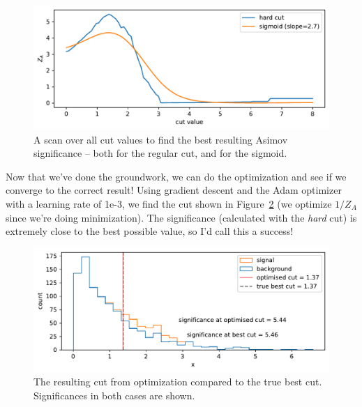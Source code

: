 \documentclass[
  11pt,
  numbers=noendperiod]{book}
\begin{document}
\begin{figure}

{\centering \includegraphics{./diffprog-hep_files/figure-pdf/fig-cut-scan-2-output-1.pdf}

}

\caption{\label{fig-cut-scan-2}A scan over all cut values to find the
best resulting Asimov significance -- both for the regular cut, and for
the sigmoid.}

\end{figure}

Now that we've done the groundwork, we can do the optimization and see
if we converge to the correct result! Using gradient descent and the
Adam optimizer with a learning rate of 1e-3, we find the cut shown in
Figure~\ref{fig-optimized-cut} (we optimize \(1/Z_A\) since we're doing
minimization). The significance (calculated with the \emph{hard} cut) is
extremely close to the best possible value, so I'd call this a success!

\begin{figure}

{\centering \includegraphics{./diffprog-hep_files/figure-pdf/fig-optimized-cut-output-1.pdf}

}

\caption{\label{fig-optimized-cut}The resulting cut from optimization
compared to the true best cut. Significances in both cases are shown.}

\end{figure}
\end{document}
